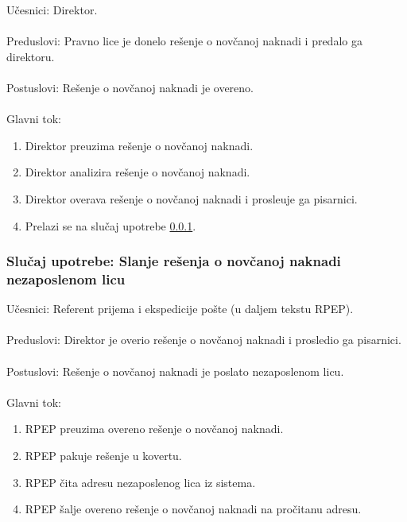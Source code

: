 \noindent U\v cesnici: Direktor.
\\
\\ Preduslovi: Pravno lice je donelo re\v senje o nov\v canoj naknadi i predalo ga direktoru.
\\
\\ Postuslovi: Re\v senje o nov\v canoj naknadi je overeno.
\\
\\ Glavni tok:
\begin{enumerate}
\item Direktor preuzima re\v senje o nov\v canoj naknadi.
\item Direktor analizira re\v senje o nov\v canoj naknadi.
\item Direktor overava re\v senje o nov\v canoj naknadi i prosle\dj uje ga pisarnici.
\item Prelazi se na slu\v caj upotrebe \ref{su: pisarnica}.
\end{enumerate}


\subsubsection{Slu\v caj upotrebe: Slanje re\v senja o nov\v canoj naknadi nezaposlenom licu}
\label{su: pisarnica}

\noindent U\v cesnici: Referent prijema i ekspedicije po\v ste (u daljem tekstu RPEP).
\\
\\ Preduslovi: Direktor je overio re\v senje o nov\v canoj naknadi i prosledio ga pisarnici.
\\
\\ Postuslovi: Re\v senje o nov\v canoj naknadi je poslato nezaposlenom licu.
\\
\\ Glavni tok:
\begin{enumerate}
\item RPEP preuzima overeno re\v senje o nov\v canoj naknadi.
\item RPEP pakuje re\v senje u kovertu.
\item RPEP \v cita adresu nezaposlenog lica iz sistema.
\item RPEP \v salje overeno re\v senje o nov\v canoj naknadi na pro\v citanu adresu.
\end{enumerate}

